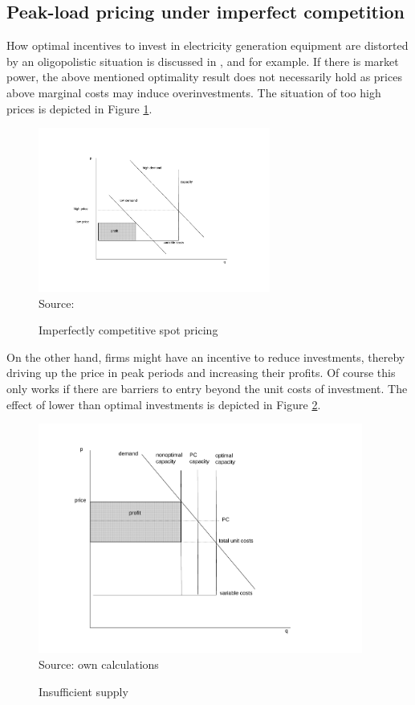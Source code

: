 \subsection{Peak-load pricing under imperfect competition}

How optimal incentives to invest in electricity generation equipment are distorted by an oligopolistic situation is discussed in \cite{Fehr1995}, \cite{Brunekreeft2005} and \cite{Grimm2007} for example. If there is market power, the above mentioned optimality result does not necessarily hold as prices above marginal costs may induce overinvestments. The situation of too high prices is depicted in Figure \ref{peak_load_toohigh}.

\begin{figure}[h]
\centering
\caption{Imperfectly competitive spot pricing}
\includegraphics[width=3.0in]{capacity/imperfect_spot_pricing}
      \label{peak_load_toohigh}  
\\          
\scriptsize Source: \cite{Fehr1995}
\end{figure}

On the other hand, firms might have an incentive to reduce investments, thereby driving up the price in peak periods and increasing their profits. Of course this only works if there are barriers to entry beyond the unit costs of investment. The effect of lower than optimal investments is depicted in Figure \ref{peak_load_insufficient}.

\begin{figure}[h]
\centering
\caption{Insufficient supply}
\includegraphics[width=4.2in]{capacity/insufficient_supply}
      \label{peak_load_insufficient}  
\\          
\scriptsize Source: own calculations
\end{figure}


